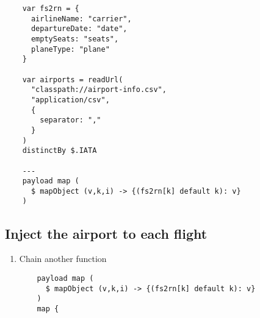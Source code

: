 \begin{enumerate}[resume*]
\begin{verbatim}
    var fs2rn = {
      airlineName: "carrier",
      departureDate: "date",
      emptySeats: "seats",
      planeType: "plane"
    }

    var airports = readUrl(
      "classpath://airport-info.csv",
      "application/csv",
      {
        separator: ","
      }
    )
    distinctBy $.IATA

    ---
    payload map (
      $ mapObject (v,k,i) -> {(fs2rn[k] default k): v}
    )
  \end{verbatim}
\end{enumerate}

\subsection{Inject the airport to each flight}
\begin{enumerate}[resume*]
\item Chain another  function
  \begin{verbatim}
    payload map (
      $ mapObject (v,k,i) -> {(fs2rn[k] default k): v}
    )
    map {
      

\end{verbatim}
\end{enumerate}

